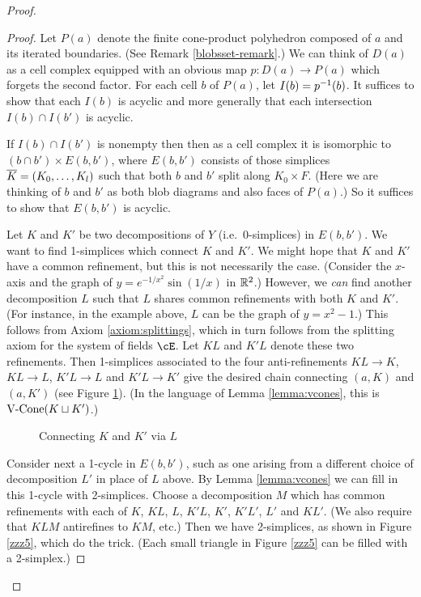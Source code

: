\begin{proof}
\begin{proof}
Let $P(a)$ denote the finite cone-product polyhedron composed of $a$ and its iterated boundaries.
(See Remark \ref{blobsset-remark}.)
We can think of $D(a)$ as a cell complex equipped with an obvious
map $p: D(a) \to P(a)$ which forgets the second factor.
For each cell $b$ of $P(a)$, let $I(b) = p^{-1}(b)$.
It suffices to show that each $I(b)$ is acyclic and more generally that
each intersection $I(b)\cap I(b')$ is acyclic.

If $I(b)\cap I(b')$ is nonempty then then as a cell complex it is isomorphic to
$(b\cap b') \times E(b, b')$, where $E(b, b')$ consists of those simplices
$\overline{K} = (K_0,\ldots,K_l)$ such that both $b$ and $b'$ split along $K_0\times F$.
(Here we are thinking of $b$ and $b'$ as both blob diagrams and also faces of $P(a)$.)
So it suffices to show that $E(b, b')$ is acyclic.

Let $K$ and $K'$ be two decompositions of $Y$ (i.e.\ 0-simplices) in $E(b, b')$.
We want to find 1-simplices which connect $K$ and $K'$.
We might hope that $K$ and $K'$ have a common refinement, but this is not necessarily
the case.
(Consider the $x$-axis and the graph of $y = e^{-1/x^2} \sin(1/x)$ in $\mathbb{R}^2$.)
However, we {\it can} find another decomposition $L$ such that $L$ shares common
refinements with both $K$ and $K'$. (For instance, in the example above, $L$ can be the graph of $y=x^2-1$.)
This follows from Axiom \ref{axiom:splittings}, which in turn follows from the
splitting axiom for the system of fields $\cE$.
Let $KL$ and $K'L$ denote these two refinements.
Then 1-simplices associated to the four anti-refinements
$KL\to K$, $KL\to L$, $K'L\to L$ and $K'L\to K'$
give the desired chain connecting $(a, K)$ and $(a, K')$
(see Figure \ref{zzz4}).
(In the language of Lemma \ref{lemma:vcones}, this is $\text{V-Cone}(K \sqcup K')$.)

\begin{figure}[t] \centering
{}
\caption{Connecting $K$ and $K'$ via $L$}
\label{zzz4}
\end{figure}

Consider next a 1-cycle in $E(b, b')$, such as one arising from
a different choice of decomposition $L'$ in place of $L$ above.
By Lemma \ref{lemma:vcones} we can fill in this 1-cycle with 2-simplices.
Choose a decomposition $M$ which has common refinements with each of 
$K$, $KL$, $L$, $K'L$, $K'$, $K'L'$, $L'$ and $KL'$.
(We also require that $KLM$ antirefines to $KM$, etc.)
Then we have 2-simplices, as shown in Figure \ref{zzz5}, which do the trick.
(Each small triangle in Figure \ref{zzz5} can be filled with a 2-simplex.)


\end{proof}
\end{proof}
